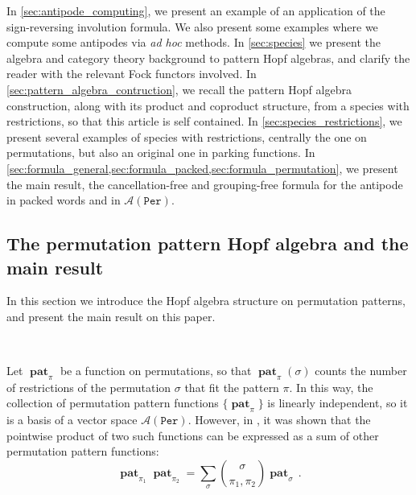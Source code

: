 \documentclass[12pt, reqno]{amsart}
\theoremstyle{definition}
\DeclareMathOperator{\pat}{\mathbf{pat}}
\begin{document}
In \cref{sec:antipode_computing}, we present an example of an application of the sign-reversing involution formula.
We also present some examples where we compute some antipodes via \textit{ad hoc} methods.
In \cref{sec:species} we present the algebra and category theory background to pattern Hopf algebras, and clarify the reader with the relevant Fock functors involved.
In \cref{sec:pattern_algebra_contruction}, we recall the pattern Hopf algebra construction, along with its product and coproduct structure, from a species with restrictions, so that this article is self contained.
In \cref{sec:species_restrictions}, we present several examples of species with restrictions, centrally the one on permutations, but also an original one in parking functions.
In \cref{sec:formula_general,sec:formula_packed,sec:formula_permutation}, we present the main result, the cancellation-free and grouping-free formula for the antipode in packed words and in $\mathcal{A}(\mathtt{Per})$.


\subsection{The permutation pattern Hopf algebra and the main result}

In this section we introduce the Hopf algebra structure on permutation patterns, and present the main result on this paper.

\

Let $\pat_{\pi}$ be a function on permutations, so that $\pat_{\pi}(\sigma)$ counts the number of restrictions of the permutation $\sigma$ that fit the pattern $\pi$.
In this way, the collection of permutation pattern functions $\{\pat_{\pi}\}$ is linearly independent, so it is a basis of a vector space $\mathcal A (\mathtt{Per})$.
However, in \cite{Vargas}, it was shown that the pointwise product of two such functions can be expressed as a sum of other permutation pattern functions:
\begin{equation}\label{eq:prodperm}
\pat_{\pi_1} \pat_{\pi_2} = \sum_{\sigma} \binom{\sigma}{\pi_1, \pi_2} \pat_{\sigma} \, .
\end{equation}
\end{document}
